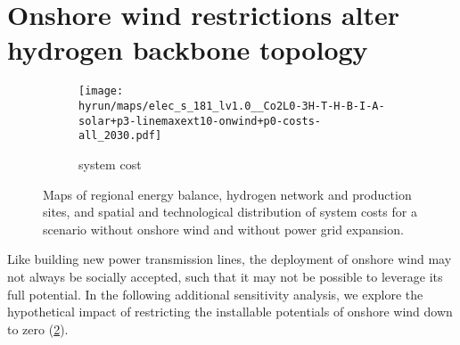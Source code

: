 \section*{Onshore wind restrictions alter hydrogen backbone topology}
\label{sec:onwind}

\begin{figure}
    \centering
    \begin{subfigure}[t]{0.6\textwidth}
        \centering
        \caption{system cost}
        \texttt{[image: \\hyrun/maps/elec\_s\_181\_lv1.0\_\_Co2L0-3H-T-H-B-I-A-solar+p3-linemaxext10-onwind+p0-costs-all\_2030.pdf]}
        \label{fig:no-onw:tsc}
    \end{subfigure}
    \caption{Maps of regional energy balance, hydrogen network and production sites, and spatial and technological distribution of system costs for a scenario without onshore wind and without power grid expansion.}
    \label{fig:no-onw}
\end{figure}


Like building new power transmission lines, the deployment of onshore wind may
not always be socially accepted, such that it may not be possible to leverage
its full potential. In the following additional sensitivity analysis, we explore
the hypothetical impact of restricting the installable potentials of onshore
wind down to zero (\cref{fig:no-onw}).

